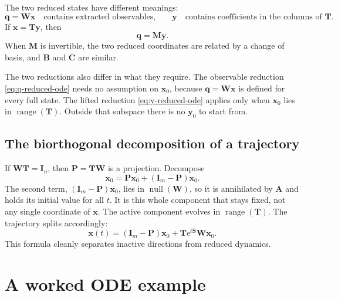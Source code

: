 \documentclass[11pt]{article}
\newcommand{\I}{\mathbf{I}}
\newcommand{\mat}[1]{\mathbf{#1}}
\newcommand{\vect}[1]{\mathbf{#1}}
\newcommand{\range}{\operatorname{range}}
\newcommand{\nullsp}{\operatorname{null}}
\newcommand{\e}{\mathrm{e}}
\theoremstyle{definition}
\theoremstyle{remark}
\begin{document}
The two reduced states have different meanings:
\begin{equation}
  \vect{q}=\mat{W}\vect{x}
  \quad\text{contains extracted observables,}
  \qquad
  \vect{y}
  \quad\text{contains coefficients in the columns of }\mat{T}.
  \label{eq:q-y-meaning}
\end{equation}
If \(\vect{x}=\mat{T}\vect{y}\), then
\begin{equation}
  \vect{q}=\mat{M}\vect{y}.
  \label{eq:q-My}
\end{equation}
When \(\mat{M}\) is invertible, the two reduced coordinates are related by a change of basis, and \(\mat{B}\) and \(\mat{C}\) are similar.

The two reductions also differ in what they require. The observable reduction \cref{eq:q-reduced-ode} needs no assumption on \(\vect{x}_0\), because \(\vect{q}=\mat{W}\vect{x}\) is defined for every full state. The lifted reduction \cref{eq:y-reduced-ode} applies only when \(\vect{x}_0\) lies in \(\range(\mat{T})\). Outside that subspace there is no \(\vect{y}_0\) to start from.

\subsection{The biorthogonal decomposition of a trajectory}

If \(\mat{W}\mat{T}=\I_n\), then \(\mat{P}=\mat{T}\mat{W}\) is a projection. Decompose
\begin{equation}
  \vect{x}_0=\mat{P}\vect{x}_0+(\I_m-\mat{P})\vect{x}_0.
  \label{eq:x0-active-inactive}
\end{equation}
The second term, \((\I_m-\mat{P})\vect{x}_0\), lies in \(\nullsp(\mat{W})\), so it is annihilated by \(\mat{A}\) and holds its initial value for all \(t\). It is this whole component that stays fixed, not any single coordinate of \(\vect{x}\). The active component evolves in \(\range(\mat{T})\). The trajectory splits accordingly:
\begin{equation}
  \vect{x}(t)
  =
  (\I_m-\mat{P})\vect{x}_0
  +\mat{T}\e^{t\mat{S}}\mat{W}\vect{x}_0.
  \label{eq:biorthogonal-solution}
\end{equation}
This formula cleanly separates inactive directions from reduced dynamics.

\section{A worked ODE example}
\label{sec:worked-ode}
\end{document}
